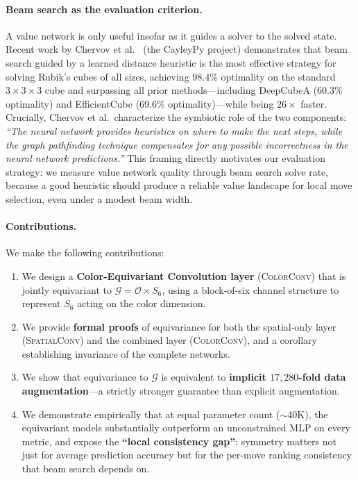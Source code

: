 \documentclass[11pt]{article}
\begin{document}
\paragraph{Beam search as the evaluation criterion.}
A value network is only useful insofar as it guides a solver to the solved
state.
Recent work by Chervov et al.~\cite{chervov2025cayleypy} (the CayleyPy project)
demonstrates that beam search guided by a learned distance heuristic
is the most effective strategy for solving Rubik's cubes of all sizes,
achieving 98.4\% optimality on the standard $3{\times}3{\times}3$ cube and
surpassing all prior methods—including DeepCubeA \cite{agostinelli2019solving}
(60.3\% optimality) and EfficientCube \cite{efficientcube} (69.6\%
optimality)—while being $26\times$ faster.
Crucially, Chervov et al.\ characterize the symbiotic role of the two
components: \emph{``The neural network provides heuristics on where to make
the next steps, while the graph pathfinding technique compensates for any
possible incorrectness in the neural network predictions.''}
This framing directly motivates our evaluation strategy: we measure value
network quality through beam search solve rate, because a good heuristic
should produce a reliable value landscape for local move selection, even
under a modest beam width.

\paragraph{Contributions.}
We make the following contributions:
\begin{enumerate}
  \item We design a \textbf{Color-Equivariant Convolution layer}
    (\textsc{ColorConv}) that is jointly equivariant to
    $\mathcal{G} = \mathcal{O} \times S_6$, using a block-of-six channel
    structure to represent $S_6$ acting on the color dimension.
  \item We provide \textbf{formal proofs} of equivariance for both the
    spatial-only layer (\textsc{SpatialConv}) and the combined layer
    (\textsc{ColorConv}), and a corollary establishing invariance of
    the complete networks.
  \item We show that equivariance to $\mathcal{G}$ is equivalent to
    \textbf{implicit $17{,}280$-fold data augmentation}—a strictly stronger
    guarantee than explicit augmentation.
  \item We demonstrate empirically that at equal parameter count (${\sim}$40K),
    the equivariant models substantially outperform an unconstrained
    \textsc{MLP} on every metric, and expose the \textbf{``local consistency
    gap''}: symmetry matters not just for average prediction accuracy but for
    the per-move ranking consistency that beam search depends on.
\end{enumerate}
\end{document}
